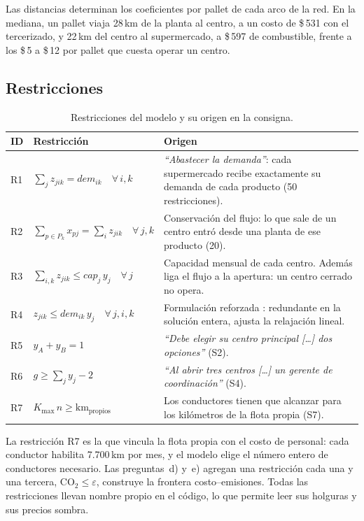 \documentclass[10pt,a4paper]{article}
\newcommand{\cita}[1]{\emph{``#1''}}
\begin{document}
Las distancias determinan los coeficientes por pallet de cada arco de la red.
En la mediana, un pallet viaja 28\,km de la planta al centro, a un costo de
\$\,531 con el tercerizado, y 22\,km del centro al supermercado, a \$\,597 de
combustible, frente a los \$\,5 a \$\,12 por pallet que cuesta operar un
centro.

\subsection{Restricciones}
\label{sec:restricciones}

\begin{table}[H]
\centering\small
\caption{Restricciones del modelo y su origen en la consigna.}
\label{tab:restricciones}
\renewcommand{\arraystretch}{1.25}
\begin{tabularx}{\linewidth}{@{}lp{5.4cm}X@{}}
\toprule
\textbf{ID} & \textbf{Restricción} & \textbf{Origen} \\
\midrule
R1 & $\sum_j z_{jik} = \mathit{dem}_{ik}\quad \forall\, i,k$ & \cita{Abastecer la demanda}: cada supermercado recibe exactamente su demanda de cada producto (50 restricciones). \\
R2 & $\sum_{p \in P_k} x_{pj} = \sum_i z_{jik}\quad \forall\, j,k$ & Conservación del flujo: lo que sale de un centro entró desde una planta de ese producto (20). \\
R3 & $\sum_{i,k} z_{jik} \leq \mathit{cap}_j\, y_j\quad \forall\, j$ & Capacidad mensual de cada centro. Además liga el flujo a la apertura: un centro cerrado no opera. \\
R4 & $z_{jik} \leq \mathit{dem}_{ik}\, y_j\quad \forall\, j,i,k$ & Formulación reforzada \cite{scipbook}: redundante en la solución entera, ajusta la relajación lineal. \\
R5 & $y_A + y_B = 1$ & \cita{Debe elegir su centro principal […] dos opciones} (S2). \\
R6 & $g \geq \sum_j y_j - 2$ & \cita{Al abrir tres centros […] un gerente de coordinación} (S4). \\
R7 & $K_{\max}\, n \geq \text{km}_{\text{propios}}$ & Los conductores tienen que alcanzar para los kilómetros de la flota propia (S7). \\
\bottomrule
\end{tabularx}
\end{table}

La restricción R7 es la que vincula la flota propia con el costo de personal:
cada conductor habilita 7.700\,km por mes, y el modelo elige el número entero
de conductores necesario. Las preguntas~d) y~e) agregan una restricción cada
una y una tercera, $\text{CO}_2 \leq \varepsilon$, construye la frontera
costo–emisiones. Todas las restricciones llevan nombre propio en el código, lo
que permite leer sus holguras y sus precios sombra.
\end{document}
